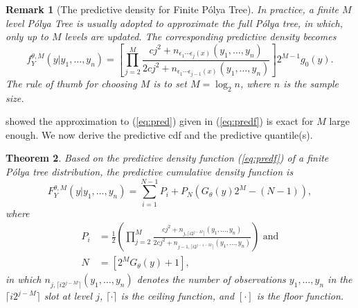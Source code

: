 \documentclass[12pt]{article}
\newtheorem{thm}{Theorem}[section]
\newtheorem{rmk}[thm]{Remark}
\newcommand{\polya}{P\'{o}lya}
\begin{document}
\begin{rmk}[The predictive density for Finite \polya{} Tree]
  In practice, a finite $M$ level \polya{} Tree is usually adopted to
  approximate the full \polya{} tree, in which, only up to $M$ levels
  are updated. The corresponding predictive density becomes
  \begin{equation}
    \label{eq:predf}
    f_Y^{\theta, M} (y|y_1, \ldots, y_n)  =  \left[
      \prod_{j=2}^M \frac{cj^2 + n_{\epsilon_1 \cdots \epsilon_j(x) }(y_1 , \ldots, y_n)}{2cj^2
        + n_{\epsilon_1 \cdots \epsilon_{j-1}(x)}(y_1, \ldots, y_n)}
    \right]2^{M-1} g_0(y).
  \end{equation}
  The rule of thumb for choosing $M$ is to set $M=\log_2n$, where $n$
  is the sample size.
\end{rmk}

\citet{hanson2002} showed the approximation to (\ref{eq:pred}) given
in (\ref{eq:predf}) is exact for $M$ large enough.  We now derive the
predictive cdf and the predictive quantile(s).

\begin{thm}
  Based on the predictive density function (\ref{eq:predf}) of a
  finite \polya{} tree distribution, the predictive cumulative density
  function is
  \begin{equation}
    \label{eq:cdf}
    F^{\theta,M}_Y(y|y_1, \ldots, y_n) = \sum_{i=1}^{N-1} P_{i} + P_N
    \left( G_{\theta}(y)2^M -(N-1) \right),
  \end{equation}
  where
  \begin{align*}
    P_i &= \frac{1}{2} \left(\prod_{j=2}^M \frac{cj^2 + n_{j,\lceil
          i2^{j-M} \rceil}(y_1, \ldots, y_n)}{2cj^2 + n_{j-1,\lceil
          i2^{j-1-M} \rceil}(y_{1 },\ldots, y_n)} \right) \mbox{ and}\\
    N & = \left[ 2^{M } G_{\theta}(y) +1\right],
  \end{align*}
  in which $n_{j,\lceil i2^{j-M} \rceil}(y_1, \ldots, y_n)$ denotes
  the number of observations $y_1, \ldots, y_n$ in the $\lceil
  i2^{j-M} \rceil$ slot at level $j$, $\lceil \cdot \rceil$ is the
  ceiling function, and $[ \cdot ]$ is the floor function.
\end{thm}
\end{document}
